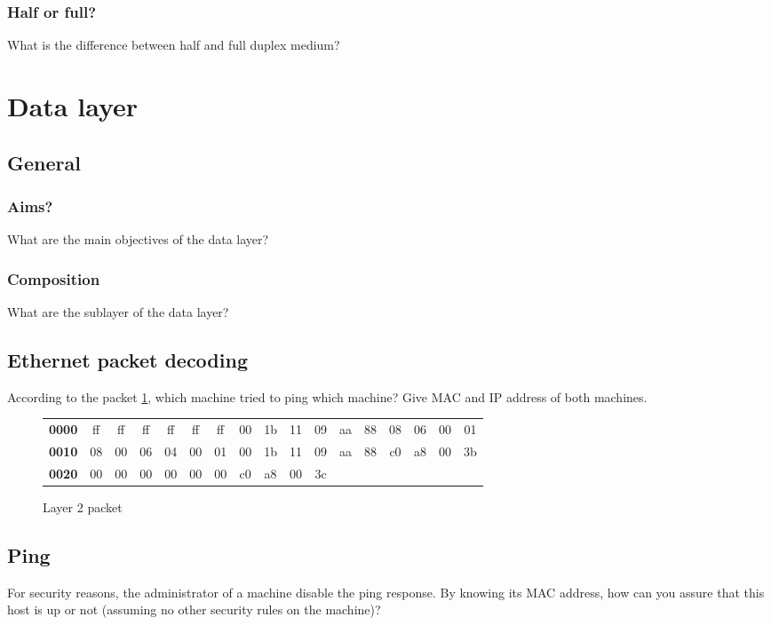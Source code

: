 \documentclass[11pt]{article}
\begin{document}
\subsubsection{Half or full?}
What is the difference between half and full duplex medium?

\section{Data layer}
\subsection{General}
\subsubsection{Aims?}
What are the main objectives of the data layer?
\subsubsection{Composition}
What are the sublayer of the data layer?
\subsection{Ethernet packet decoding}
According to the packet \ref{fig:arp_req_ex}, which machine tried to ping which machine? Give MAC and IP address of both machines.
  \begin{figure}[h]
  \centering
  \resizebox{16cm}{!} {
    \begin{tabular}{lcccccccccccccccc}
      \textbf{0000} & ff & ff & ff & ff & ff & ff & 00 & 1b & 11 & 09 & aa & 88 & 08 & 06 & 00 & 01 \\
      \textbf{0010} & 08 & 00 & 06 & 04 & 00 & 01 & 00 & 1b & 11 & 09 & aa & 88 & c0 & a8 & 00 & 3b \\
      \textbf{0020} & 00 & 00 & 00 & 00 & 00 & 00 & c0 & a8 & 00 & 3c \\
    \end{tabular}
  }
  \caption{Layer 2 packet}
  \label{fig:arp_req_ex}
  \end{figure}
\subsection{Ping}
For security reasons, the administrator of a machine disable the ping response. By knowing its MAC address, how can you assure that this host is up or not (assuming no other security rules on the machine)?
\end{document}
